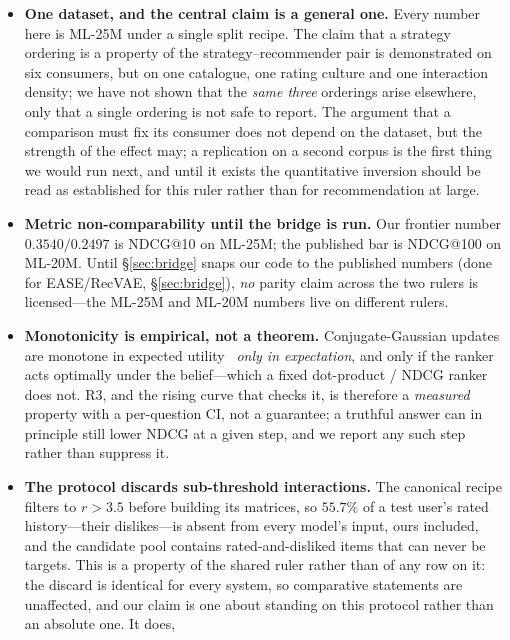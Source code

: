 \documentclass[11pt]{article}
\begin{document}
\begin{itemize}[leftmargin=1.4em,itemsep=3pt]
  \item \textbf{One dataset, and the central claim is a general one.} Every number here is ML-25M under a
        single split recipe. The claim that a strategy ordering is a property of the strategy--recommender
        pair is demonstrated on six consumers, but on one catalogue, one rating culture and one interaction
        density; we have not shown that the \emph{same three} orderings arise elsewhere, only that a single
        ordering is not safe to report. The argument that a comparison must fix its consumer does not
        depend on the dataset, but the strength of the effect may; a replication on a second corpus is the
        first thing we would run next, and until it exists the quantitative inversion should be read as
        established for this ruler rather than for recommendation at large.
  \item \textbf{Metric non-comparability until the bridge is run.} Our frontier number $0.3540/0.2497$ is NDCG@10
        on ML-25M; the published bar is NDCG@100 on ML-20M. Until \S\ref{sec:bridge} snaps our code to the published
        numbers (done for EASE/RecVAE, \S\ref{sec:bridge}), \emph{no} parity claim across the two rulers is
        licensed---the ML-25M and ML-20M numbers live on different rulers.
  \item \textbf{Monotonicity is empirical, not a theorem.} Conjugate-Gaussian updates are monotone in expected
        utility~\cite{good1967principle,blackwell1953equivalent} \emph{only in expectation}, and only if the ranker acts optimally under the
        belief---which a fixed dot-product / NDCG ranker does not. R3, and the rising curve that checks it, is therefore a
        \emph{measured} property with a per-question CI, not a guarantee; a truthful answer can in principle still
        lower NDCG at a given step, and we report any such step rather than suppress it.
  \item \textbf{The protocol discards sub-threshold interactions.} The canonical recipe filters to
        $r>3.5$ before building its matrices, so $55.7\%$ of a test user's rated history---their
        dislikes---is absent from every model's input, ours included, and the candidate pool contains
        rated-and-disliked items that can never be targets. This is a property of the shared ruler rather
        than of any row on it: the discard is identical for every system, so comparative statements are
        unaffected, and our claim is one about standing on this protocol rather than an absolute one. It does,

\end{itemize}
\end{document}
